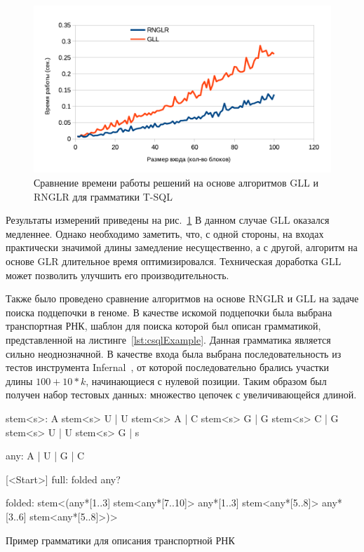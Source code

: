 \begin{figure}
 \centering
 \includegraphics[width=\textwidth]{Ragozina/pics/SQL.pdf}
 \caption{Сравнение времени работы решений на основе алгоритмов GLL и RNGLR для грамматики T-SQL}
 \label{exp3}
\end{figure}

Результаты измерений приведены на рис.~\ref{exp3} В данном случае GLL оказался медленнее. Однако необходимо заметить, что, с одной стороны, на входах практически значимой длины замедление несущественно, а с другой, алгоритм на основе GLR длительное время оптимизировался. Техническая доработка GLL может позволить улучшить его производительность.

Также было проведено сравнение алгоритмов на основе RNGLR и GLL на задаче поиска подцепочки в геноме. В качестве искомой подцепочки была выбрана транспортная РНК, шаблон для поиска которой был описан грамматикой, представленной на листинге~\ref{lst:csqlExample}. Данная грамматика является сильно неоднозначной. В качестве входа была выбрана последовательность из тестов инструмента Infernal~\cite{Infernal}, от которой последовательно брались участки длины $100 + 10*k$, начинающиеся с нулевой позиции. Таким образом был получен набор тестовых данных: множество цепочек с увеличивающейся длиной.

\begin{listing}
    \begin{pyglist}[language=ocaml,numbers=left,numbersep=5pt]

stem<s>: 
      A stem<s> U | U stem<s> A
    | C stem<s> G | G stem<s> C
    | G stem<s> U | U stem<s> G
    | s

any: A | U | G | C

[<Start>]
full: folded any?
                        
folded: stem<(any*[1..3] stem<any*[7..10]> 
              any*[1..3] stem<any*[5..8]> 
              any*[3..6] 
              stem<any*[5..8]>)> 

\end{pyglist}
\caption{Пример грамматики для описания транспортной РНК}
\label{lst:csqlExample}
\end{listing}

